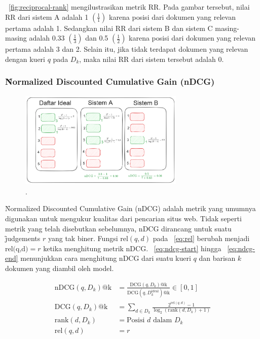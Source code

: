         \pic~\ref{fig:reciprocal-rank} mengilustrasikan metrik RR. Pada gambar tersebut, nilai RR dari sistem A adalah 1 $(\frac{1}{1})$ karena posisi dari dokumen yang relevan pertama adalah 1. Sedangkan nilai RR dari sistem B dan sistem C masing-masing adalah  0.33 $(\frac{1}{3})$ dan 0.5 $(\frac{1}{2})$ karena posisi dari dokumen yang relevan pertama adalah 3 dan 2. Selain itu, jika tidak terdapat dokumen yang relevan dengan kueri $q$ pada $D_k$, maka nilai RR dari sistem tersebut adalah 0. 

    \subsubsection{\f{Normalized Discounted Cumulative Gain} (nDCG)}

        \begin{figure}
            \centering
            \includegraphics[width=0.70\textwidth]{assets/pics/contohnDCG.png}
            \caption{\license.}
            \label{fig:ndcg}
        \end{figure}

        \f{Normalized Discounted Cumulative Gain} (nDCG) adalah metrik yang umumnya digunakan untuk mengukur kualitas dari pencarian situs web. Tidak seperti metrik yang telah disebutkan sebelumnya, nDCG dirancang untuk suatu \f{judgements} $r$ yang tak biner. Fungsi $\text{rel}(q, d)$ pada \equ~\ref{eq:rel} berubah menjadi $\text{rel(q,d)}  = r $ ketika menghitung metrik nDCG. \equ~\ref{eq:ndcg-start} hingga \equ~\ref{eq:ndcg-end} menunjukkan cara menghitung nDCG dari suatu kueri $q$ dan barisan $k$ dokumen yang diambil oleh model.

        \begin{align}
            \label{eq:ndcg-start}
            \text{nDCG}(q, D_k)\text{@k} &= \frac{\text{DCG}(q, D_k)\text{@k}}{\text{DCG}(q, D_k^{\text{ideal}})\text{@k}} \in [0, 1] \\
            \label{eq:dcg}
            \text{DCG}(q, D_k)\text{@k} &= \sum_{d \in D_k} \frac{2^{\text{rel}(q, d)} - 1}{\log_2(\text{rank}(d, D_k) + 1)} \\
            \label{eq:ndcg-end}
            \text{rank}(d,D_k) &= \text{Posisi } d \text{ dalam } D_k \\
            \text{rel}(q, d) &= r
        \end{align}

